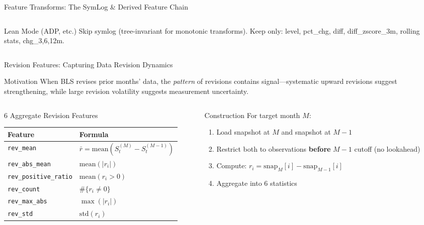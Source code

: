 \documentclass[aspectratio=169,10pt]{beamer}
\begin{document}
\begin{frame}{Feature Transforms: The SymLog \& Derived Feature Chain}
\begin{columns}[T]
\begin{column}{0.42\textwidth}
\vspace{0.15cm}
\begin{alertblock}{Lean Mode (ADP, etc.)}
\footnotesize
Skip symlog (tree-invariant for monotonic transforms). Keep only: level, pct\_chg, diff, diff\_zscore\_3m, rolling stats, chg\_{3,6,12}m.
\end{alertblock}
\end{column}
\end{columns}
\end{frame}

\begin{frame}{Revision Features: Capturing Data Revision Dynamics}
\begin{block}{Motivation}
\footnotesize
When BLS revises prior months' data, the \emph{pattern} of revisions contains signal---systematic upward revisions suggest strengthening, while large revision volatility suggests measurement uncertainty.
\end{block}

\vspace{0.2cm}
\begin{columns}[T]
\begin{column}{0.48\textwidth}
\begin{block}{6 Aggregate Revision Features}
\scriptsize
\begin{tabular}{@{}lp{4.5cm}@{}}
\toprule
\textbf{Feature} & \textbf{Formula} \\
\midrule
\texttt{rev\_mean} & $\bar{r} = \text{mean}(S_t^{(M)} - S_t^{(M-1)})$ \\
\texttt{rev\_abs\_mean} & $\text{mean}(|r_i|)$ \\
\texttt{rev\_positive\_ratio} & $\text{mean}(r_i > 0)$ \\
\texttt{rev\_count} & $\#\{r_i \ne 0\}$ \\
\texttt{rev\_max\_abs} & $\max(|r_i|)$ \\
\texttt{rev\_std} & $\text{std}(r_i)$ \\
\bottomrule
\end{tabular}
\end{block}
\end{column}
\begin{column}{0.48\textwidth}
\begin{block}{Construction}
\scriptsize
For target month $M$:
\begin{enumerate}
  \item Load snapshot at $M$ and snapshot at $M{-}1$
  \item Restrict both to observations \textbf{before} $M{-}1$ cutoff (no lookahead)
  \item Compute: $r_i = \text{snap}_M[i] - \text{snap}_{M-1}[i]$
  \item Aggregate into 6 statistics
\end{enumerate}
\end{block}
\end{column}
\end{columns}
\end{frame}
\end{document}
